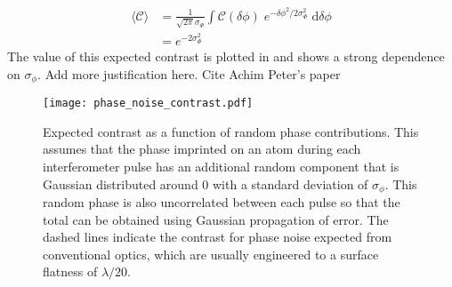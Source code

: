 \begin{align}
    \langle \mathcal{C} \rangle &= \frac{1}{\sqrt{2\pi}\sigma_\Phi}\int \mathcal{C}(\delta \phi) \; e^{-\delta\phi^2/2\sigma_\Phi^2} \; \mathrm{d}\delta\phi \\
    &= e^{-2 \sigma_\Phi^2}
\end{align}
The value of this expected contrast is plotted in  and shows a strong dependence on \(\sigma_\phi\). 
{\huge Add more justification here. Cite Achim Peter's paper}  
\begin{figure}
    \centering
    \texttt{[image: phase\_noise\_contrast.pdf]}
    \caption{Expected contrast as a function of random phase contributions. This assumes that the phase imprinted on an atom during each interferometer pulse has an additional random component that is Gaussian distributed around 0 with a standard deviation of \(\sigma_\phi\). This random phase is also uncorrelated between each pulse so that the total can be obtained using Gaussian propagation of error. The dashed lines indicate the contrast for phase noise expected from conventional optics, which are usually engineered to a surface flatness of \(\lambda/20\).}
    \label{fig:raman_phasenoise}
\end{figure}
